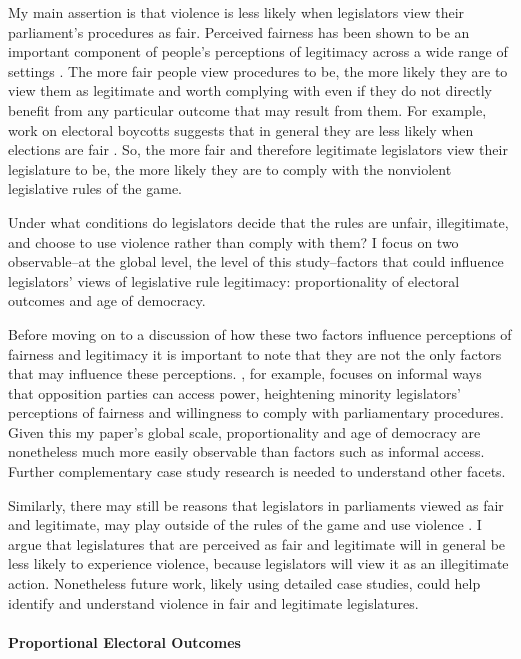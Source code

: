 \documentclass[a4paper]{article}\usepackage{graphicx, color}
\begin{document}
My main assertion is that violence is less likely when legislators view their parliament's procedures as fair. Perceived fairness has been shown to be an important component of people's perceptions of legitimacy across a wide range of settings \citep[see][]{thibaut1975,Tyler2001,Tyler2006}. The more fair people view procedures to be, the more likely they are to view them as legitimate and worth complying with even if they do not directly benefit from any particular outcome that may result from them. For example, work on electoral boycotts suggests that in general they are less likely when elections are fair \citep{Bratton1998,Lindberg2006}. So, the more fair and therefore legitimate legislators view their legislature to be, the more likely they are to comply with the nonviolent legislative rules of the game.   

Under what conditions do legislators decide that the rules are unfair, illegitimate, and choose to use violence rather than comply with them? I focus on two observable--at the global level, the level of this study--factors that could influence legislators' views of legislative rule legitimacy: proportionality of electoral outcomes and age of democracy.

Before moving on to a discussion of how these two factors influence perceptions of fairness and legitimacy it is important to note that they are not the only factors that may influence these perceptions. \cite{Wolfe2004}, for example, focuses on informal ways that opposition parties can access power, heightening minority legislators' perceptions of fairness and willingness to comply with parliamentary procedures. Given this my paper's global scale, proportionality and age of democracy are nonetheless much more easily observable than factors such as informal access. Further complementary case study research is needed to understand other facets. 

Similarly, there may still be reasons that legislators in parliaments viewed as fair and legitimate, may play outside of the rules of the game and use violence \citep[see][regarding election boycotts]{Beaulieu2008}. I argue that legislatures that are perceived as fair and legitimate will in general be less likely to experience violence, because legislators will view it as an illegitimate action. Nonetheless future work, likely using detailed case studies, could help identify and understand violence in fair and legitimate legislatures.  

\paragraph{Proportional Electoral Outcomes}
\end{document}
